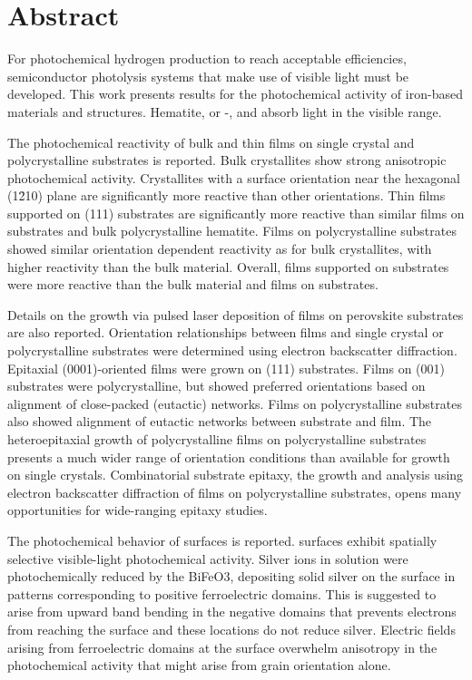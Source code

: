 \chapter{Abstract}

For photochemical hydrogen production to reach acceptable efficiencies, 
semiconductor photolysis systems that make use of visible light must be 
developed. This work presents results for the photochemical activity of 
iron-based materials and structures. Hematite, or \textalpha-, 
and  absorb light in the visible range. 

The photochemical reactivity of bulk  and thin  films 
on single crystal and polycrystalline substrates is reported. Bulk 
 crystallites show strong anisotropic photochemical activity. 
Crystallites with a surface orientation near the hexagonal (1\={2}10) 
plane are significantly more reactive than other orientations. Thin 
 films supported on  (111) substrates are 
significantly more reactive than similar films on  substrates 
and bulk polycrystalline hematite. Films on polycrystalline substrates 
showed similar orientation dependent reactivity as for bulk  
crystallites, with higher reactivity than the bulk material. Overall, 
films supported on  substrates were more reactive than the 
bulk material and films on  substrates.

Details on the growth via pulsed laser deposition of  films on 
perovskite  substrates are also reported. Orientation 
relationships between films and single crystal or polycrystalline 
substrates were determined using electron backscatter diffraction. 
Epitaxial (0001)-oriented films were grown on  (111) 
substrates. Films on  (001) substrates were polycrystalline, 
but showed preferred orientations based on alignment of close-packed 
(eutactic) networks. Films on polycrystalline  substrates also 
showed alignment of eutactic networks between substrate and film. The 
heteroepitaxial growth of polycrystalline films on polycrystalline 
substrates presents a much wider range of orientation conditions than 
available for growth on single crystals. Combinatorial substrate epitaxy, 
the growth and analysis using electron backscatter diffraction of films 
on polycrystalline substrates, opens many opportunities for wide-ranging 
epitaxy studies. 

The photochemical behavior of  surfaces is reported. 
 surfaces exhibit spatially selective visible-light 
photochemical activity. Silver ions in solution were photochemically 
reduced by the BiFeO3, depositing solid silver on the surface in patterns 
corresponding to positive ferroelectric domains. This is suggested to 
arise from upward band bending in the negative domains that prevents 
electrons from reaching the surface and these locations do not reduce 
silver. Electric fields arising from ferroelectric domains at the surface 
overwhelm anisotropy in the photochemical activity that might arise from 
grain orientation alone.